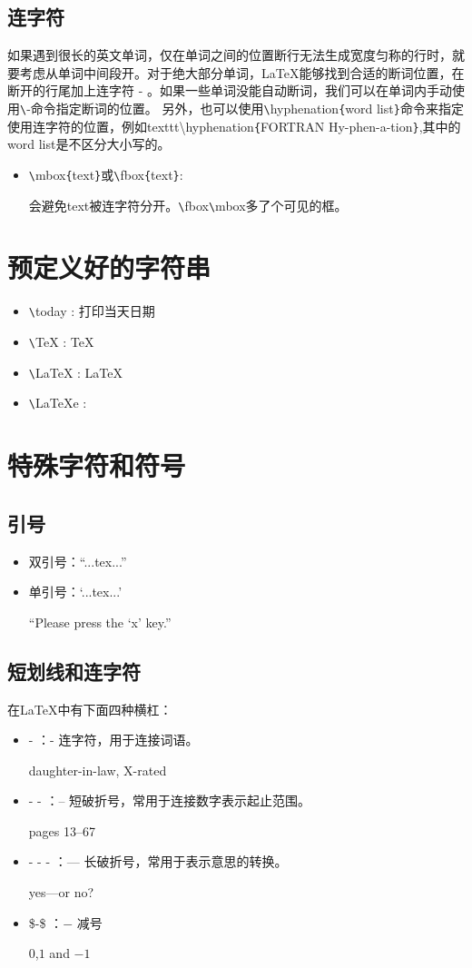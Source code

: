 \documentclass[UTF8]{ctexart}
\begin{document}
\subsection{连字符}
如果遇到很长的英文单词，仅在单词之间的位置断行无法生成宽度匀称的行时，就要考虑从单词中间段开。对于绝大部分单词，\LaTeX 能够找到合适的断词位置，在断开的行尾加上连字符 - 。如果一些单词没能自动断词，我们可以在单词内手动使用\texttt{\textbackslash}-命令指定断词的位置。
另外，也可以使用\texttt{\textbackslash}hyphenation\texttt{\{}word list\texttt{\}}命令来指定使用连字符的位置，例如texttt{\textbackslash}hyphenation\texttt{\{}FORTRAN Hy-phen-a-tion\texttt{\}},其中的word list是不区分大小写的。
\begin{itemize}
   \item \texttt{\textbackslash}mbox\texttt{\{}text\texttt{\}}或\texttt{\textbackslash}fbox\texttt{\{}text\texttt{\}}:

   会避免text被连字符分开。\texttt{\textbackslash}fbox\texttt{\textbackslash}mbox多了个可见的框。
\end{itemize}
\section{预定义好的字符串}
\begin{itemize}
  \item \texttt{\textbackslash}today : 打印当天日期
  \item \texttt{\textbackslash}TeX : \TeX
  \item \texttt{\textbackslash}LaTeX : \LaTeX
  \item \texttt{\textbackslash}LaTeXe : \LaTeXe
\end{itemize}
\section{特殊字符和符号}
\subsection{引号}
\begin{itemize}
  \item 双引号：``...tex...''
  \item 单引号：`...tex...'

     ``Please press the `x' key.''
\end{itemize}
\subsection{短划线和连字符}
在\LaTeX 中有下面四种横杠：
\begin{itemize}
   \item - ：- 连字符，用于连接词语。

   daughter-in-law, X-rated
   \item - - ：-- 短破折号，常用于连接数字表示起止范围。

   pages 13--67
   \item - - - ：--- 长破折号，常用于表示意思的转换。

   yes---or no?
   \item \$-\$ ：$-$ 减号

   $0$,$1$ and $-1$
\end{itemize}
\end{document}
